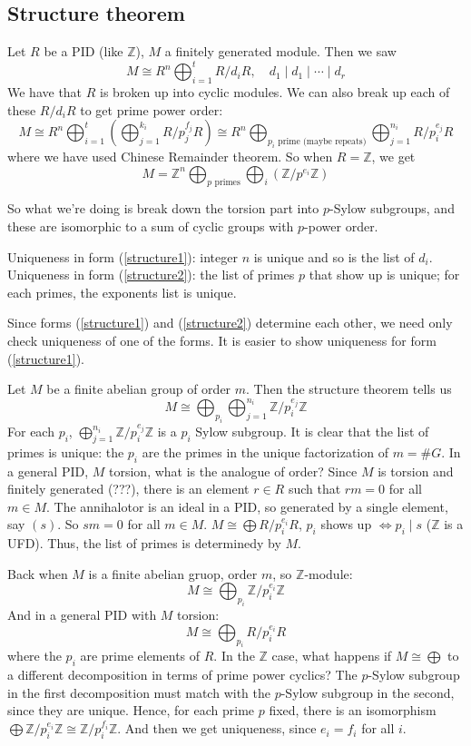 \documentclass{article}
\theoremstyle{plain}
\theoremstyle{remark}
\newcommand{\Z}{{\mathbb Z}}
\begin{document}
\subsection{Structure theorem}
Let $R$ be a PID (like $\Z$), $M$ a finitely generated module.
Then we saw
\[
	M \cong R^n \bigoplus_{i=1}^t R/d_iR, \quad d_1\mid d_1 \mid \cdots \mid d_r
\]
We have that $R$ is broken up into cyclic modules.
We can also break up each of these $R/d_i R$ to get prime power order:
\begin{equation}\label{structure1}
	M \cong R^n \bigoplus_{i=1}^t \left(\bigoplus_{j=1}^{k_i} R/p_j^{f_j}R\right)
	\cong R^n \bigoplus_{p_i \text{ prime (maybe repeats)}} \bigoplus_{j=1}^{n_i}
	R/p_i^{e_j}R
\end{equation}
where we have used Chinese Remainder theorem.
So when $R = \Z$, we get
\begin{equation}\label{structure2}
	M = \Z^n \bigoplus_{p \text{ primes}} \bigoplus_i \left(\Z/p^{e_i}\Z\right)
\end{equation}

So what we're doing is break down the torsion part into $p$-Sylow subgroups,
and these are isomorphic to a sum of cyclic groups with $p$-power order.

Uniqueness in form (\ref{structure1}):
integer $n$ is unique and so is the list of $d_i$.
Uniqueness in form (\ref{structure2}):
the list of primes $p$ that show up is unique;
for each primes, the exponents list is unique.

Since forms (\ref{structure1}) and (\ref{structure2}) determine each other,
we need only check uniqueness of one of the forms.
It is easier to show uniqueness for form (\ref{structure1}).

Let $M$ be a finite abelian group of order $m$.
Then the structure theorem tells us
\[
	M \cong \bigoplus_{p_i} \bigoplus_{j = 1}^{n_i} \Z/p_i^{e_j}\Z
\]
For each $p_i$, $\bigoplus_{j=1}^{n_i} \Z/p_i^{e_j}\Z$ is a $p_i$ Sylow subgroup.
It is clear that the list of primes is unique:
the $p_i$ are the primes in the unique factorization of $m = \# G$.
In a general PID, $M$ torsion,
what is the analogue of order?
Since $M$ is torsion and finitely generated (???), there is an element $r \in R$ such that
$rm = 0$ for all $m \in M$.
The annihalotor is an ideal in a PID, so generated by a single element,
say $(s)$.
So $sm = 0$ for all $m \in M$.
$M \cong \bigoplus R/p_i^{e_i} R$, $p_i$ shows up $\iff p_i \mid s$
($\Z$ is a UFD).
Thus, the list of primes is determinedy by $M$.

Back when $M$ is a finite abelian gruop, order $m$, so $\Z$-module:
\[
	M \cong \bigoplus_{p_i} \Z/p_i^{e_i} \Z
\]
And in a general PID with $M$ torsion:
\[
	M \cong \bigoplus_{p_i} R/p_i^{e_i}R
\]
where the $p_i$ are prime elements of $R$.
In the $\Z$ case, what happens if $M \cong \bigoplus$ to a different decomposition
in terms of prime power cyclics?
The $p$-Sylow subgroup in the first decomposition
must match with the $p$-Sylow subgroup in the second,
since they are unique.
Hence, for each prime $p$ fixed,
there is an isomorphism $\bigoplus \Z/p_i^{e_i}\Z \cong \Z/p_i^{f_i}\Z$.
And then we get uniqueness, since $e_i = f_i$ for all $i$.
\end{document}
